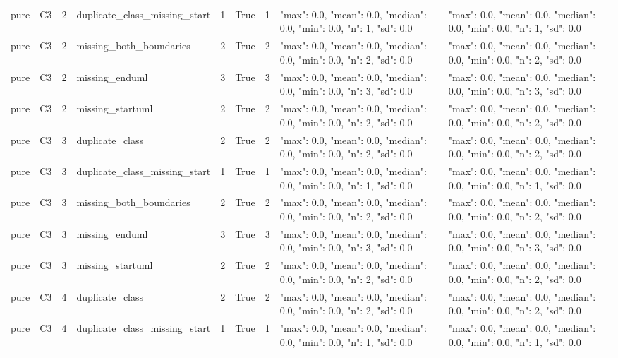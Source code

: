 \begin{tabular}{lllllllll}
pure & C3 & 2 & duplicate\_class\_missing\_start & 1 & True & 1 & {"max": 0.0, "mean": 0.0, "median": 0.0, "min": 0.0, "n": 1, "sd": 0.0} & {"max": 0.0, "mean": 0.0, "median": 0.0, "min": 0.0, "n": 1, "sd": 0.0} \\
pure & C3 & 2 & missing\_both\_boundaries & 2 & True & 2 & {"max": 0.0, "mean": 0.0, "median": 0.0, "min": 0.0, "n": 2, "sd": 0.0} & {"max": 0.0, "mean": 0.0, "median": 0.0, "min": 0.0, "n": 2, "sd": 0.0} \\
pure & C3 & 2 & missing\_enduml & 3 & True & 3 & {"max": 0.0, "mean": 0.0, "median": 0.0, "min": 0.0, "n": 3, "sd": 0.0} & {"max": 0.0, "mean": 0.0, "median": 0.0, "min": 0.0, "n": 3, "sd": 0.0} \\
pure & C3 & 2 & missing\_startuml & 2 & True & 2 & {"max": 0.0, "mean": 0.0, "median": 0.0, "min": 0.0, "n": 2, "sd": 0.0} & {"max": 0.0, "mean": 0.0, "median": 0.0, "min": 0.0, "n": 2, "sd": 0.0} \\
pure & C3 & 3 & duplicate\_class & 2 & True & 2 & {"max": 0.0, "mean": 0.0, "median": 0.0, "min": 0.0, "n": 2, "sd": 0.0} & {"max": 0.0, "mean": 0.0, "median": 0.0, "min": 0.0, "n": 2, "sd": 0.0} \\
pure & C3 & 3 & duplicate\_class\_missing\_start & 1 & True & 1 & {"max": 0.0, "mean": 0.0, "median": 0.0, "min": 0.0, "n": 1, "sd": 0.0} & {"max": 0.0, "mean": 0.0, "median": 0.0, "min": 0.0, "n": 1, "sd": 0.0} \\
pure & C3 & 3 & missing\_both\_boundaries & 2 & True & 2 & {"max": 0.0, "mean": 0.0, "median": 0.0, "min": 0.0, "n": 2, "sd": 0.0} & {"max": 0.0, "mean": 0.0, "median": 0.0, "min": 0.0, "n": 2, "sd": 0.0} \\
pure & C3 & 3 & missing\_enduml & 3 & True & 3 & {"max": 0.0, "mean": 0.0, "median": 0.0, "min": 0.0, "n": 3, "sd": 0.0} & {"max": 0.0, "mean": 0.0, "median": 0.0, "min": 0.0, "n": 3, "sd": 0.0} \\
pure & C3 & 3 & missing\_startuml & 2 & True & 2 & {"max": 0.0, "mean": 0.0, "median": 0.0, "min": 0.0, "n": 2, "sd": 0.0} & {"max": 0.0, "mean": 0.0, "median": 0.0, "min": 0.0, "n": 2, "sd": 0.0} \\
pure & C3 & 4 & duplicate\_class & 2 & True & 2 & {"max": 0.0, "mean": 0.0, "median": 0.0, "min": 0.0, "n": 2, "sd": 0.0} & {"max": 0.0, "mean": 0.0, "median": 0.0, "min": 0.0, "n": 2, "sd": 0.0} \\
pure & C3 & 4 & duplicate\_class\_missing\_start & 1 & True & 1 & {"max": 0.0, "mean": 0.0, "median": 0.0, "min": 0.0, "n": 1, "sd": 0.0} & {"max": 0.0, "mean": 0.0, "median": 0.0, "min": 0.0, "n": 1, "sd": 0.0} \\

\end{tabular}
